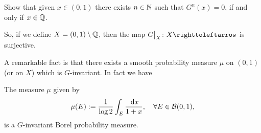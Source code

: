 \begin{exercise}
  Show that given $x\in (0,1)$ there exists $n\in\mathbb{N}$ such that $G^{n}(x)= 0$, if and only if $x\in\mathbb{Q}$.
\end{exercise}

So, if we define $X=(0,1)\setminus\mathbb{Q}$, then the map $G\big|_{X}\colon X\carr$ is surjective.

A remarkable fact is that there exists a smooth probability measure $\mu$ on $(0,1)$ (or on $X$) which is $G$-invariant. In fact we have

\begin{theorem}
  The measure $\mu$ given by
  \begin{displaymath}
    \mu(E):=\frac{1}{\log 2}\int_{E} \frac{\:\mathrm{d} x}{1+x}, \quad\forall E\in\mathcal{B}(0,1),
  \end{displaymath}
  is a $G$-invariant Borel probability measure.
\end{theorem}

